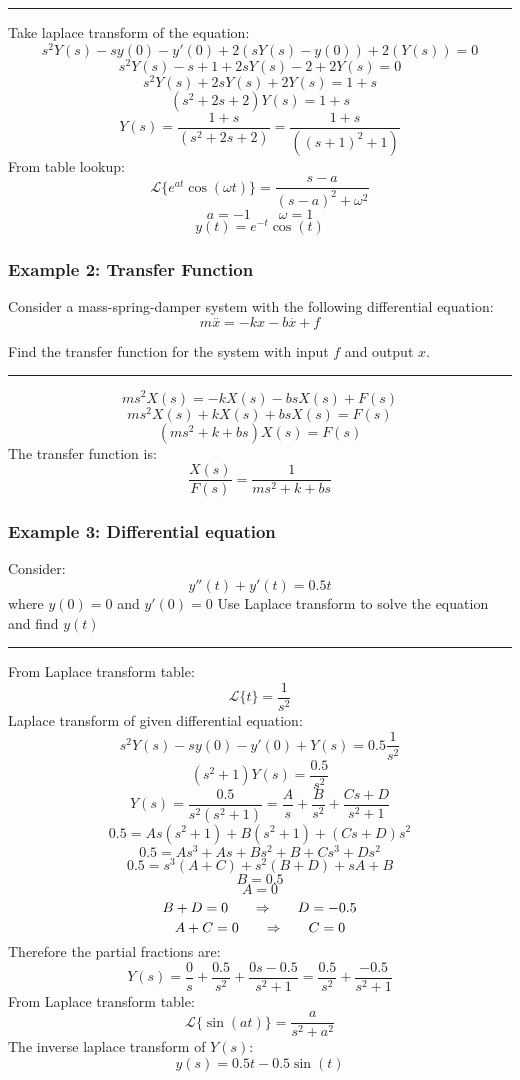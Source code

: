 \rule{\textwidth}{0.5pt}

Take laplace transform of the equation:
$$s^2Y(s)-sy(0)-y'(0)+2(sY(s)-y(0))+2(Y(s))=0$$
$$s^2Y(s)-s+1+2sY(s)-2+2Y(s)=0$$
$$s^2Y(s)+2sY(s)+2Y(s)=1+s$$
$$(s^2+2s+2)Y(s)=1+s$$
$$Y(s)=\frac{1+s}{(s^2+2s+2)}=\frac{1+s}{((s+1)^2+1)}$$
From table lookup:
$$\mathcal{L}\{e^{at}\cos(\omega t)\}=\frac{s-a}{(s-a)^2+\omega^2}$$
$$a=-1\qquad \omega=1$$
$$y(t)=e^{-t}\cos(t)$$



\subsubsection{Example 2: Transfer Function}
Consider a mass-spring-damper system with the following differential equation:
$$m\overset{..}{x}=-kx-b\overset{.}{x}+f$$

Find the transfer function for the system with input $f$ and output $x$.

\rule{\textwidth}{0.5pt}

$$ms^2X(s)=-kX(s)-bsX(s)+F(s)$$
$$ms^2X(s)+kX(s)+bsX(s)=F(s)$$
$$(ms^2+k+bs)X(s)=F(s)$$
The transfer function is:
$$\frac{X(s)}{F(s)}=\displaystyle\frac{1}{ms^2+k+bs}$$

\subsubsection{Example 3: Differential equation}
Consider:
$$y''(t)+y'(t)=0.5t$$
where $y(0)=0$ and $y'(0)=0$
Use Laplace transform to solve the equation and find $y(t)$

\rule{\textwidth}{0.5pt}

From Laplace transform table:
$$\mathcal{L}\{t\}=\frac{1}{s^2}$$
Laplace transform of given differential equation:
$$s^2Y(s)-sy(0)-y'(0)+Y(s)=0.5\frac{1}{s^2}$$
$$(s^2+1)Y(s)=\frac{0.5}{s^2}$$
$$Y(s)=\frac{0.5}{s^2(s^2+1)}=\frac{A}{s}+\frac{B}{s^2}+\frac{Cs+D}{s^2+1}$$
$$0.5=As(s^2+1)+B(s^2+1)+(Cs+D)s^2$$
$$0.5=As^3+As+Bs^2+B+Cs^3+Ds^2$$
$$0.5=s^3(A+C)+s^2(B+D)+sA+B$$
$$B=0.5$$
$$A=0$$
$$B+D=0{\qquad\Rightarrow\qquad} D=-0.5$$
$$A+C=0{\qquad\Rightarrow\qquad} C=0$$
Therefore the partial fractions are:
$$Y(s)=\frac{0}{s}+\frac{0.5}{s^2}+\frac{0s-0.5}{s^2+1}=\frac{0.5}{s^2}+\frac{-0.5}{s^2+1}$$
From Laplace transform table:
$$\mathcal{L}\{\sin(at)\}=\frac{a}{s^2+a^2}$$
The inverse laplace transform of $Y(s)$:
$$y(s)=0.5t-0.5\sin(t)$$
